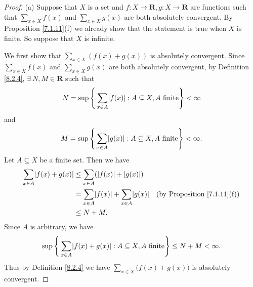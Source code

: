 \begin{proof}{(a)}
    Suppose that \(X\) is a set and \(f : X \to \mathbf{R}, g : X \to \mathbf{R}\) are functions such that \(\sum_{x \in X} f(x)\) and \(\sum_{x \in X} g(x)\) are both absolutely convergent.
    By Proposition \ref{7.1.11}(f) we already show that the statement is true when \(X\) is finite.
    So suppose that \(X\) is infinite.

    We first show that \(\sum_{x \in X} (f(x) + g(x))\) is absolutely convergent.
    Since \(\sum_{x \in X} f(x)\) and \(\sum_{x \in X} g(x)\) are both absolutely convergent, by Definition \ref{8.2.4}, \(\exists\ N, M \in \mathbf{R}\) such that
    \[
        N = \sup\Bigg\{\sum_{x \in A} \abs*{f(x)} : A \subseteq X, A \text{ finite}\Bigg\} < \infty
    \]
    and
    \[
        M = \sup\Bigg\{\sum_{x \in A} \abs*{g(x)} : A \subseteq X, A \text{ finite}\Bigg\} < \infty.
    \]
    Let \(A \subseteq X\) be a finite set.
    Then we have
    \begin{align*}
        \sum_{x \in A} \abs*{f(x) + g(x)} & \leq \sum_{x \in A} (\abs*{f(x)} + \abs*{g(x)})                                                     \\
                                          & = \sum_{x \in A} \abs*{f(x)} + \sum_{x \in A} \abs*{g(x)} & \text{(by Proposition \ref{7.1.11}(f))} \\
                                          & \leq N + M.
    \end{align*}
    Since \(A\) is arbitrary, we have
    \[
        \sup\Bigg\{\sum_{x \in A} \abs*{f(x) + g(x)} : A \subseteq X, A \text{ finite}\Bigg\} \leq N + M < \infty.
    \]
    Thus by Definition \ref{8.2.4} we have \(\sum_{x \in X} \big(f(x) + g(x)\big)\) is absolutely convergent.


\end{proof}
